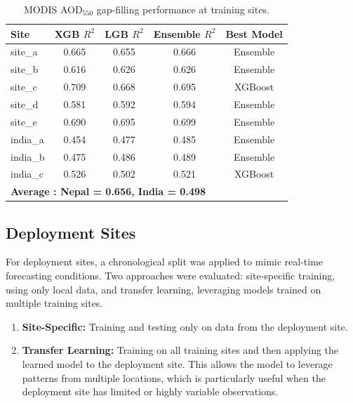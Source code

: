 \documentclass[12pt]{report}
\begin{document}
\begin{table}[h!]
\centering
\caption{MODIS AOD$_{550}$ gap-filling performance at training sites.}
\label{tab:modis_training}
\vspace{.3cm}
\begin{tabular}{|l|c|c|c|c|}
\hline
\textbf{Site} & \textbf{XGB $R^2$} & \textbf{LGB $R^2$} & \textbf{Ensemble} $R^2$ & \textbf{Best Model} \\
\hline
site\_a & 0.665 & 0.655 & 0.666 & Ensemble \\
\hline
site\_b & 0.616 & 0.626 & 0.626 & Ensemble \\
\hline
site\_c & 0.709 & 0.668 & 0.695 & XGBoost \\
\hline
site\_d & 0.581 & 0.592 & 0.594 & Ensemble \\
\hline
site\_e & 0.690 & 0.695 & 0.699 & Ensemble \\
\hline
india\_a & 0.454 & 0.477 & 0.485 & Ensemble \\
\hline
india\_b & 0.475 & 0.486 & 0.489 & Ensemble \\
\hline
india\_c & 0.526 & 0.502 & 0.521 & XGBoost \\
\hline
\multicolumn{5}{|l|}{\textbf{Average  : Nepal = 0.656,  
India = 0.498}} \\
\hline
\end{tabular}
\end{table}

\subsection{Deployment Sites}

For deployment sites, a chronological split was applied to mimic real-time forecasting conditions. Two approaches were evaluated: site-specific training, using only local data, and transfer learning, leveraging models trained on multiple training sites.
\begin{enumerate}
    \item \textbf{Site-Specific:} Training and testing only on data from the deployment site.  
    \item \textbf{Transfer Learning:} Training on all training sites and then applying the learned model to the deployment site. This allows the model to leverage patterns from multiple locations, which is particularly useful when the deployment site has limited or highly variable observations.
\end{enumerate}
\end{document}
